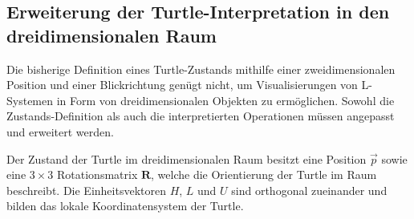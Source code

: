 \subsection{Erweiterung der Turtle-Interpretation in den dreidimensionalen Raum}

Die bisherige Definition eines Turtle-Zustands mithilfe einer zweidimensionalen Position und einer Blickrichtung genügt nicht, um Visualisierungen von L-Systemen in Form von dreidimensionalen Objekten zu ermöglichen. Sowohl die Zustands-Definition als auch die interpretierten Operationen müssen angepasst und erweitert werden.

Der Zustand der Turtle im dreidimensionalen Raum besitzt eine Position $\overrightarrow{p}$ sowie eine $3\times3$ Rotationsmatrix $\boldsymbol{R}$, welche die Orientierung der Turtle im Raum beschreibt. Die Einheitsvektoren $H$, $L$ und $U$  sind orthogonal zueinander und bilden das lokale Koordinatensystem der Turtle.

